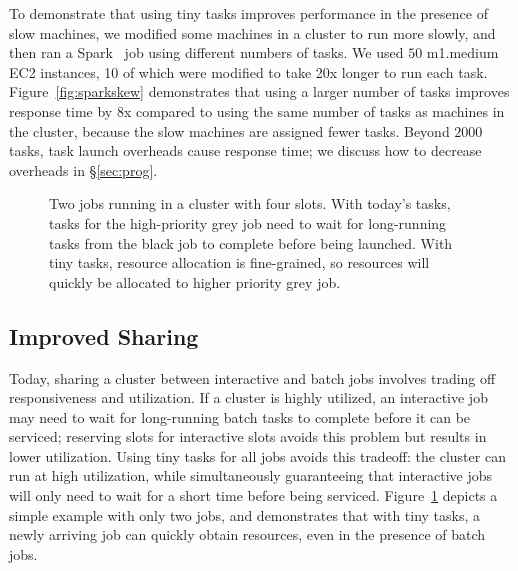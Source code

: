 To demonstrate that using tiny tasks improves performance in
the presence of slow machines,
we modified some machines in a cluster to run more slowly, and then
ran a Spark~\cite{zaharia2010spark} job using different numbers of tasks. 
We used $50$ m1.medium EC2
instances, 10 of which were modified to take 20x longer to run each task.
Figure~\ref{fig:sparkskew} demonstrates that using a larger number of tasks
improves response time by 8x compared to using the same number
of tasks as machines in the cluster, because the slow machines are
assigned fewer tasks. Beyond $2000$ tasks, task launch overheads cause response time; we discuss
how to decrease overheads in \S\ref{sec:prog}.

\begin{figure}[t]
\centering
{}
\vspace{-0.1in}
\caption{Two jobs running in a cluster with four slots. With today's tasks,
tasks for the high-priority grey job need to wait for long-running tasks from the black job to
complete before being launched.
With tiny tasks, resource
allocation is fine-grained, so resources will quickly be allocated to
higher priority grey job.}
\vspace{-2ex}
\label{fig:slot_diagram}
\end{figure}


\subsection{Improved Sharing}
Today, sharing a cluster between interactive and batch jobs involves trading off
responsiveness and utilization. If a cluster is highly utilized,
an interactive job may need to wait for long-running batch tasks to
complete before it can be serviced; reserving slots for
interactive slots avoids this problem but results in lower utilization.
Using tiny tasks for all jobs avoids this tradeoff: the cluster can run at
high utilization, while
simultaneously guaranteeing that interactive jobs will only need to wait for
a short time before being serviced. Figure~\ref{fig:slot_diagram} depicts a simple example
with only two jobs, and demonstrates that with tiny tasks, a newly arriving
job can quickly obtain resources, even in the presence
of batch jobs.
